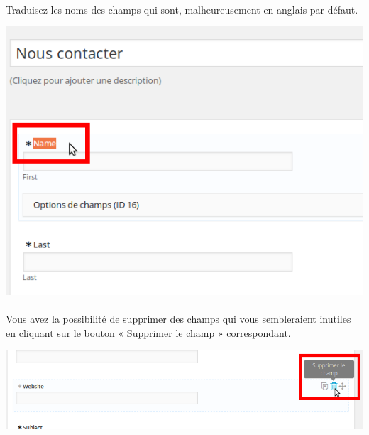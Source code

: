 \documentclass[10pt,a4paper]{article}
\begin{document}
\paragraph{}Traduisez les noms des champs qui sont, malheureusement en anglais par défaut.
\begin{center}
\includegraphics[scale=0.3]{img/0184.png}
\end{center}
\paragraph{}Vous avez la possibilité de supprimer des champs qui vous sembleraient inutiles en cliquant sur le bouton « Supprimer le champ » correspondant.
\begin{center}
\includegraphics[scale=0.3]{img/0185.png}
\end{center}
\end{document}
